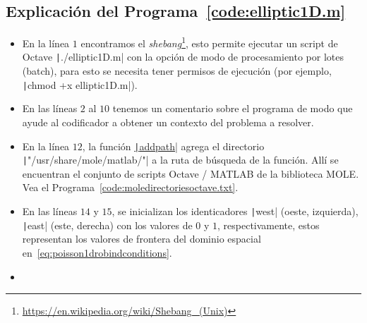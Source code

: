 \begin{problem}
\section*{Explicación del Programa~\ref{code:elliptic1D.m}} %

\begin{itemize}
      \item

            En la línea $1$ encontramos el
            \emph{shebang}\footnote{\url{https://en.wikipedia.org/wiki/Shebang_(Unix)}},
            esto permite ejecutar un script de Octave
            \texttt|./elliptic1D.m| con la opción de modo de
            procesamiento por lotes (batch), para esto se necesita
            tener permisos de ejecución (por ejemplo,
            \texttt|chmod +x elliptic1D.m|).

      \item

            En las líneas $2$ al $10$ tenemos un comentario sobre el
            programa de modo que ayude al codificador a obtener un
            contexto del problema a resolver.

      \item

            En la línea $12$, la función
            \href{https://docs.octave.org/v9.3.0/Manipulating-the-Load-Path.html#index-addpath}{\texttt|addpath|}
            agrega el directorio
            \texttt|"/usr/share/mole/matlab/"| a la ruta de
            búsqueda de la función.
            Allí se encuentran el conjunto de scripts Octave / MATLAB
            de la biblioteca MOLE.
            Vea el Programa~\ref{code:moledirectoriesoctave.txt}.

      \item

            En las líneas $14$ y $15$, se inicializan los identicadores
            \texttt|west| (oeste, izquierda),
            \texttt|east| (este, derecha) con los valores
            de $0$ y $1$, respectivamente, estos representan los
            valores de frontera del dominio espacial
            en~\eqref{eq:poisson1drobindconditions}.

      \item


\end{itemize}
\end{problem}
